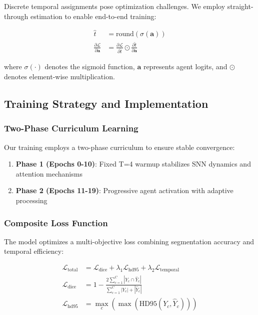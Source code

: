 \documentclass[12pt,a4paper]{article}
\begin{document}
Discrete temporal assignments pose optimization challenges. We employ straight-through estimation to enable end-to-end training:

\begin{align}
\hat{t} &= \text{round}(\sigma(\mathbf{a})) \\
\frac{\partial \mathcal{L}}{\partial \mathbf{a}} &= \frac{\partial \mathcal{L}}{\partial \hat{t}} \odot \frac{\partial \hat{t}}{\partial \mathbf{a}}
\end{align}

where $\sigma(\cdot)$ denotes the sigmoid function, $\mathbf{a}$ represents agent logits, and $\odot$ denotes element-wise multiplication.

\subsection{Training Strategy and Implementation}

\subsubsection{Two-Phase Curriculum Learning}

Our training employs a two-phase curriculum to ensure stable convergence:

\begin{enumerate}
\item \textbf{Phase 1 (Epochs 0-10)}: Fixed T=4 warmup stabilizes SNN dynamics and attention mechanisms
\item \textbf{Phase 2 (Epochs 11-19)}: Progressive agent activation with adaptive processing
\end{enumerate}

\subsubsection{Composite Loss Function}

The model optimizes a multi-objective loss combining segmentation accuracy and temporal efficiency:

\begin{align}
\mathcal{L}_{\text{total}} &= \mathcal{L}_{\text{dice}} + \lambda_1 \mathcal{L}_{\text{hd95}} + \lambda_2 \mathcal{L}_{\text{temporal}} \\
\mathcal{L}_{\text{dice}} &= 1 - \frac{2 \sum_{c=1}^{C} |Y_c \cap \hat{Y}_c|}{\sum_{c=1}^{C} |Y_c| + |\hat{Y}_c|} \\
\mathcal{L}_{\text{hd95}} &= \max_{c} \left( \max(\text{HD95}(Y_c, \hat{Y}_c)) \right)
\end{align}
\end{document}
